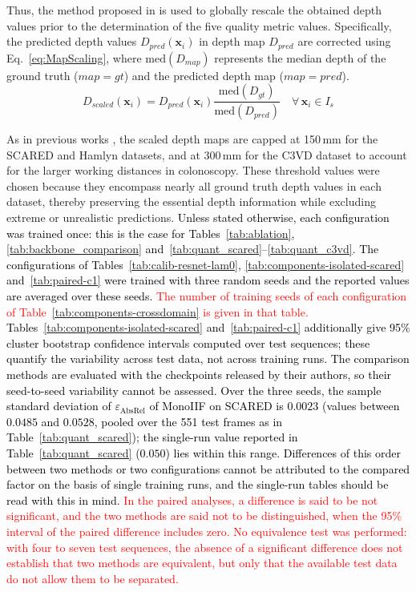 \documentclass[a4paper,fleqn]{cas-dc}
\begin{document}
Thus, the method proposed in \citep{Godard_ICCV_2019} is used to globally rescale the obtained depth values prior to the determination of the five quality metric values. Specifically, the predicted depth values \( D_{pred}(\mathbf{x}_i) \) in depth map \( D_{pred} \) are corrected using Eq.~\eqref{eq:MapScaling}, where \( \textrm{med}(D_{map}) \) represents the median depth of the ground truth (\( map = gt \)) and the predicted depth map (\( map = pred \)).
%
\begin{equation} \label{eq:MapScaling}
    D_{scaled}(\mathbf{x}_i) = D_{pred}(\mathbf{x}_i) \frac{\textrm{med}(D_{gt})} {\textrm{med}(D_{pred})} \quad \forall \, \mathbf{x}_i \in I_s
\end{equation}
%

As in previous works \citep{Godard_ICCV_2019,Ozyoruk_MIA_2021,Shao_MIA_2022}, the scaled depth maps are capped at 150\,mm for the SCARED and Hamlyn datasets, and at 300\,mm for the C3VD dataset to account for the larger working distances in colonoscopy. These threshold values were chosen because they encompass nearly all ground truth depth values in each dataset, thereby preserving the essential depth information while excluding extreme or unrealistic predictions.
\textcolor{black}
{
Unless stated otherwise, each configuration was trained once: this is the case for
Tables~\ref{tab:ablation}, \ref{tab:backbone_comparison} and~\ref{tab:quant_scared}--\ref{tab:quant_c3vd}.
The configurations of Tables~\ref{tab:calib-resnet-lam0}, \ref{tab:components-isolated-scared}
and~\ref{tab:paired-c1} were trained with three random seeds and the reported values are averaged over these seeds. \textcolor{red}{The number of training seeds of each configuration of Table~\ref{tab:components-crossdomain} is given in that table.} Tables~\ref{tab:components-isolated-scared} and~\ref{tab:paired-c1} additionally
give 95\% cluster bootstrap confidence intervals computed over test sequences; these quantify the
variability across test data, not across training runs. The comparison methods are evaluated with
the checkpoints released by their authors, so their seed-to-seed variability cannot be assessed.
Over the three seeds, the sample standard deviation of $\varepsilon_\textrm{AbsRel}$ of MonoIIF on
SCARED is $0.0023$ (values between $0.0485$ and $0.0528$, pooled over the 551 test frames as in
Table~\ref{tab:quant_scared}); the single-run value reported in Table~\ref{tab:quant_scared}
($0.050$) lies within this range. Differences of this order between two methods or two
configurations cannot be attributed to the compared factor on the basis of single training runs,
and the single-run tables should be read with this in mind. \textcolor{red}{In the paired analyses, a difference is said to be not significant, and the two methods are said not to be distinguished, when the 95\% interval of the paired difference includes zero. No equivalence test was performed: with four to seven test sequences, the absence of a significant difference does not establish that two methods are equivalent, but only that the available test data do not allow them to be separated.}}
\end{document}
